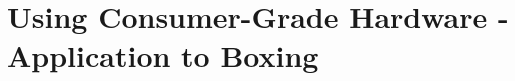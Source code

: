 
\lhead[\fancyplain{}{\leftmark}]%
      {\fancyplain{}{}} %
\chead[\fancyplain{}{}]%
      {\fancyplain{}{}}
\rhead[\fancyplain{}{}]%
      {\fancyplain{}{\rightmark}}%
\lfoot[\fancyplain{}{}]%
      {\fancyplain{}{}}
\cfoot[\fancyplain{}{\thepage}]%
      {\fancyplain{}{\thepage}} %
\rfoot[\fancyplain{}{}]%
     {\fancyplain{}{\scriptsize}}



\chapter{Using Consumer-Grade Hardware - Application to Boxing}
\label{ch:6}





